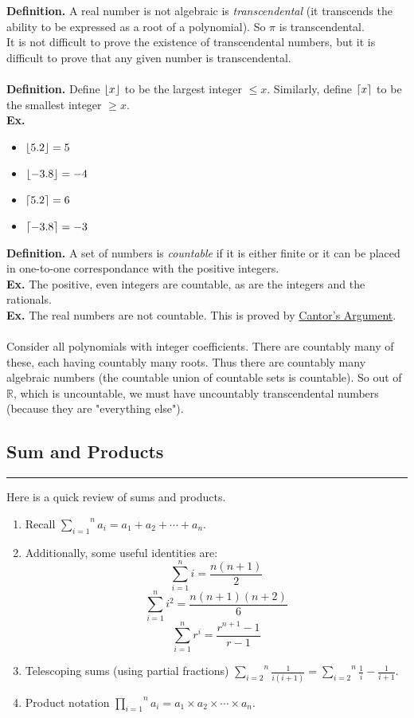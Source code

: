 \documentclass[class=article, crop=false]{standalone}
\def\inlinesum#1#2{\overset{#2}{\underset{#1}{\sum}}}
\def\inlineprod#1#2{\overset{#2}{\underset{#1}{\prod}}}
\DeclarePairedDelimiter\ceil{\lceil}{\rceil}
\DeclarePairedDelimiter\floor{\lfloor}{\rfloor}
\begin{document}
\textbf{Definition.} A real number is not algebraic is \emph{transcendental} (it transcends the ability to be expressed as a root of a polynomial).
So $\pi$ is transcendental.\\
It is not difficult to prove the existence of transcendental numbers, but it is difficult to prove that any given number is transcendental.\\\\
\textbf{Definition.} Define $\floor{x}$ to be the largest integer $\leq x$. Similarly, define $\ceil{x}$ to be the smallest integer $\geq x$.\\
\textbf{Ex.}
	\begin{itemize}
		\item $\floor{5.2} = 5$
		\item $\floor{-3.8} = -4$
		\item $\ceil{5.2} = 6$
		\item $\ceil{-3.8} = -3$
	\end{itemize}
\textbf{Definition.} A set of numbers is \emph{countable} if it is either finite or it can be placed in one-to-one correspondance
with the positive integers.\\
\textbf{Ex.} The positive, even integers are countable, as are the integers and the rationals.\\
\textbf{Ex.} The real numbers are not countable. This is proved by \href{https://jlmartin.ku.edu/~jlmartin/courses/math410-S13/cantor.pdf}{Cantor's Argument}.\\\\
Consider all polynomials with integer coefficients. There are countably many of these, each having countably many roots.
Thus there are countably many algebraic numbers (the countable union of countable sets is countable). So out of $\mathbb{R}$,
which is uncountable, we must have uncountably transcendental numbers (because they are "everything else").

\subsection{Sum and Products}
\rule{\textwidth}{1pt}
Here is a quick review of sums and products.
\begin{enumerate}[1.]
	\item Recall $\inlinesum{i=1}{n}a_i = a_1 + a_2 + \cdots + a_n$.
	\item Additionally, some useful identities are: $$\sum_{i=1}^{n} i = \frac{n(n+1)}{2}$$ 
	$$\sum_{i=1}^{n} i^2 = \frac{n(n+1)(n+2)}{6}$$
	$$\sum_{i=1}^{n} r^i = \frac{r^{n+1}-1}{r-1}$$
	\item Telescoping sums (using partial fractions) $\inlinesum{i=2}{n}\frac{1}{i(i+1)} = \inlinesum{i=2}{n}\frac{1}{i}-\frac{1}{i+1}$.
	\item Product notation $\inlineprod{i=1}{n} a_i = a_1 \times a_2 \times\cdots\times a_n$.
\end{enumerate}
\end{document}
